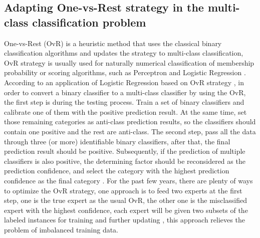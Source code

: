 \documentclass[conference]{IEEEtran}
\begin{document}
\subsection{Adapting One-vs-Rest strategy in the multi-class classification problem}
One-vs-Rest (OvR) is a heuristic method that uses the classical binary classification algorithms and updates the strategy to multi-class classification, OvR strategy is usually used for naturally numerical classification of membership probability or scoring algorithms, such as Perceptron and Logistic Regression \cite{b12}. According to an application of Logistic Regression based on OvR strategy \cite{b13}, in order to convert a binary classifier to a multi-class classifier by using the OvR, the first step is during the testing process. Train a set of binary classifiers and calibrate one of them with the positive prediction result. At the same time, set those remaining categories as anti-class prediction results, so the classifiers should contain one positive and the rest are anti-class. The second step, pass all the data through three (or more) identifiable binary classifiers, after that, the final prediction result should be positive. Subsequently, if the prediction of multiple classifiers is also positive, the determining factor should be reconsidered as the prediction confidence, and select the category with the highest prediction confidence as the final category \cite{b13}. For the past few years, there are plenty of ways to optimize the OvR strategy, one approach is to feed two experts at the first step, one is the true expert as the usual OvR, the other one is the misclassified expert with the highest confidence, each expert will be given two subsets of the labeled instances for training and further updating \cite{b14}, this approach relieves the problem of imbalanced training data.
\end{document}
